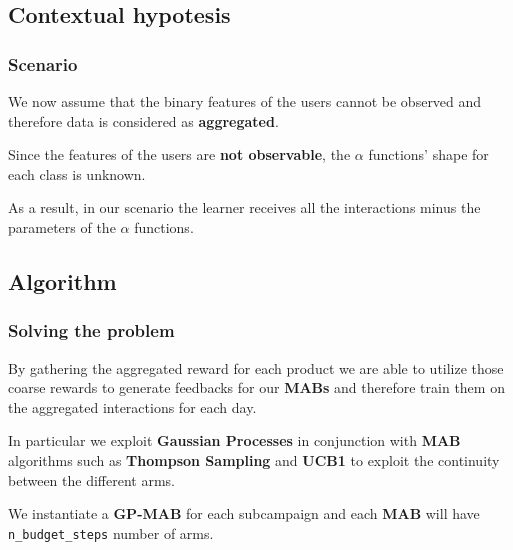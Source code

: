 
\subsection{Contextual hypotesis}


\begin{frame}

\frametitle{Scenario}

We now assume that the binary features of the users cannot be observed and therefore data is considered as \textbf{aggregated}.

Since the features of the users are \textbf{not observable}, the $\alpha$ functions' shape for each class is unknown.

As a result, in our scenario the learner receives all the interactions minus the parameters of the $\alpha$ functions.

\end{frame}


\subsection{Algorithm}


\begin{frame}

\frametitle{Solving the problem}

By gathering the aggregated reward for each product we are able to utilize those coarse rewards to generate feedbacks for our \textbf{MABs} and therefore train them on the aggregated interactions for each day.

In particular we exploit \textbf{Gaussian Processes} in conjunction with \textbf{MAB} algorithms such as \textbf{Thompson Sampling} and \textbf{UCB1} to exploit the continuity between the different arms.

We instantiate a \textbf{GP-MAB} for each subcampaign and each \textbf{MAB} will have \texttt{n\_budget\_steps} number of arms.

\end{frame}


